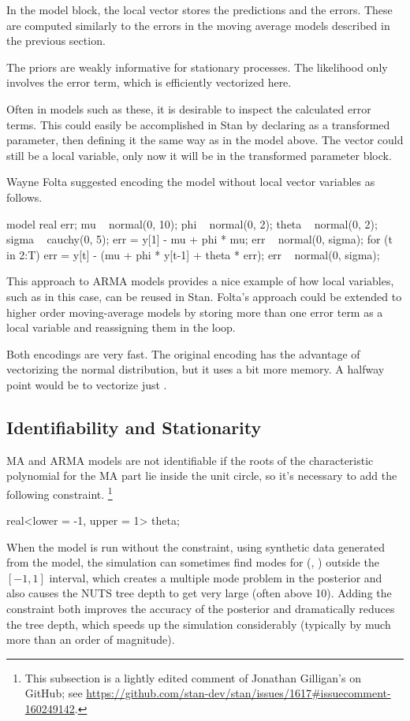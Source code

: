 In the model block, the local vector  stores the predictions
and  the errors.  These are computed similarly to the
errors in the moving average models described in the previous section.

The priors are weakly informative for stationary processes.  The
likelihood only involves the error term, which is efficiently
vectorized here.

Often in models such as these, it is desirable to inspect the
calculated error terms.  This could easily be accomplished in Stan by
declaring  as a transformed parameter, then defining it the
same way as in the model above.  The vector  could still be a
local variable, only now it will be in the transformed parameter block.

Wayne Folta suggested encoding the model without local vector
variables as follows.
%
\begin{stancode}
model {
  real err;
  mu ~ normal(0, 10);
  phi ~ normal(0, 2);
  theta ~ normal(0, 2);
  sigma ~ cauchy(0, 5);
  err = y[1] - mu + phi * mu;
  err ~ normal(0, sigma);
  for (t in 2:T) {
    err = y[t] - (mu + phi * y[t-1] + theta * err);
    err ~ normal(0, sigma);
  }
}
\end{stancode}
%
This approach to ARMA models provides a nice example of how local
variables, such as  in this case, can be reused in Stan.
Folta's approach could be extended to higher order moving-average
models by storing more than one error term as a local variable and
reassigning them in the loop.

Both encodings are very fast.  The original encoding has the advantage
of vectorizing the normal distribution, but it uses a bit more memory.
A halfway point would be to vectorize just .

\subsection{Identifiability and Stationarity}%

MA and ARMA models are not identifiable if the roots of the
characteristic polynomial for the MA part lie inside the unit circle,
so it's necessary to add the following constraint.%
%
\footnote{This subsection is a lightly edited comment of Jonathan
  Gilligan's on GitHub; see
  \url{https://github.com/stan-dev/stan/issues/1617\#issuecomment-160249142}.}
%
\begin{stancode}
real<lower = -1, upper = 1> theta;
\end{stancode}
%
When the model is run without the constraint, using synthetic data
generated from the model, the simulation can sometimes find modes for
(, ) outside the $[-1,1]$ interval, which
creates a multiple mode problem in the posterior and also causes the
NUTS tree depth to get very large (often above 10). Adding the
constraint both improves the accuracy of the posterior and
dramatically reduces the tree depth, which speeds up the simulation
considerably (typically by much more than an order of magnitude).

